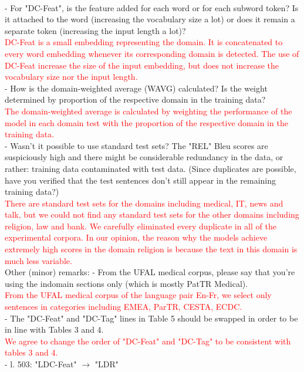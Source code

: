 \documentclass[12pt,times,a4paper,twoside]{article}
\theoremstyle{definition}
\begin{document}
\\
- For "DC-Feat", is the feature added for each word or for each subword token? Is it attached to the word (increasing the vocabulary size a lot) or does it remain a separate token (increasing the input length a lot)?
\\
\textcolor{red}{DC-Feat is a small embedding representing the domain. It is concatenated to every word embedding whenever its corresponding domain is detected. The use of DC-Feat increase the size of the input embedding, but does not increase the vocabulary size nor the input length.}
\\
- How is the domain-weighted average (WAVG) calculated? Is the weight determined by proportion of the respective domain in the training data?
\\
\textcolor{red}{The domain-weighted average is calculated by weighting the performance of the model in each domain test with the proportion of the respective domain in the training data.}
\\
- Wasn't it possible to use standard test sets? The "REL" Bleu scores are suspiciously high and there might be considerable redundancy in the data, or rather: training data contaminated with test data. (Since duplicates are possible, have you verified that the test sentences don't still appear in the remaining training data?)
\\
\textcolor{red}{There are standard test sets for the domains including medical, IT, news and talk, but we could not find any standard test sets for the other domains including religion, law and bank. We carefully eliminated every duplicate in all of the experimental corpora. In our opinion, the reason why the models achieve extremely high scores in the domain religion is because the text in this domain is much less variable.}
\\
Other (minor) remarks:
- From the UFAL medical corpus, please say that you're using the indomain sections only (which is mostly PatTR Medical).
\\
\textcolor{red}{From the UFAL medical corpus of the language pair En-Fr, we select only sentences in categories including EMEA, ParTR, CESTA, ECDC.}
\\
- The "DC-Feat" and "DC-Tag" lines in Table 5 should be swapped in order to be in line with Tables 3 and 4.
\\
\textcolor{red}{We agree to change the order of "DC-Feat" and "DC-Tag" to be consistent with tables 3 and 4.}
\\
- l. 503: "LDC-Feat" $\rightarrow$ "LDR"
\end{document}
